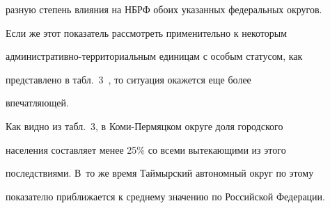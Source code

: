 разную степень влияния на НБРФ обоих указанных федеральных округов.


Если же этот показатель рассмотреть применительно к некоторым


административно-территориальным единицам с особым статусом, как


представлено в табл.~3~\cite{7-luc}, то ситуация окажется еще более


впечатляющей.





    Как видно из табл.~3, в Коми-Пермяцком округе доля городского


населения составляет менее 25\% со всеми вытекающими из этого


последствиями. В~то же время Таймырский автономный округ по этому


показателю приближается к среднему значению по Российской Федерации.





